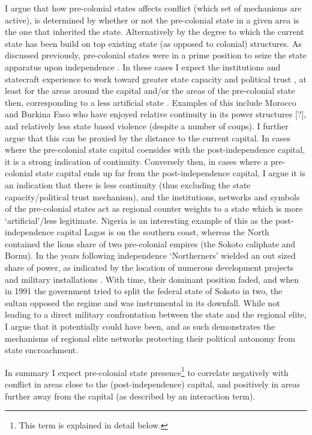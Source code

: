\documentclass[12pt]{article}
\begin{document}
I argue that how pre-colonial states affects conflict (which set of mechanisms
are active), is determined by whether or not the pre-colonial state in a given
area is the one that inherited the state. Alternatively by the degree to which
the current state has been build on top existing state (as opposed to colonial)
structures. As discussed previously, pre-colonial states were in a prime
position to seize the state apparatus upon independence \citep{Paine2019}. In
these cases I expect the institutions and statecraft experience to work toward
greater state capacity and political trust \citep{Depetris-Chauvin2016}, at
least for the areas around the capital and/or the areas of the pre-colonial
state then, corresponding to a less artificial state \citep{Alesina2011}.
Examples of this include Morocco and Burkina Faso who have enjoyed relative
continuity in its power structures [?], and relatively less state based violence
(despite a number of coups). I further argue that this can be proxied by the
distance to the current capital. In cases where the pre-colonial state capital
coensides with the post-independence capital, it is a strong indication of
continuity. 
Conversely then, in cases where a pre-colonial state capital ends up far from
the post-independence capital, I argue it is an indication that there is less
continuity (thus excluding the state capacity/political trust mechanism), and
the institutions, networks and symbols of the pre-colonial states act as 
regional counter weights to a state which is more `artificial'/less legitimate.
Nigeria is an interesting example of this as the post-independence capital Lagos
is on the southern coast, whereas the North contained the lions share of two
pre-colonial empires (the Sokoto caliphate and Bornu). In the years following
independence `Northerners' wielded an out sized share of power, as indicated by
the location of numerous development projects and military installations
\citep{Bates2008a}. With time, their dominant position faded, and when in 1991
the government tried to split the federal state of Sokoto in two, the sultan
opposed the regime and was instrumental in its downfall. While not leading to a
direct military confrontation between the state and the regional elite, I argue
that it potentially could have been, and as such demonstrates the mechanisms of
regional elite networks protecting their political autonomy from state
encroachment.

In summary I expect pre-colonial state presence\footnote{This term is explained
in detail below.} to correlate negatively with conflict in areas close to the
(post-independence) capital, and positively in areas further away from the
capital (as described by an interaction term).
\end{document}
